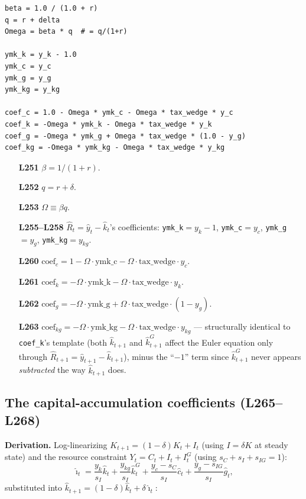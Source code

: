 \documentclass[11pt]{article}
\newcommand{\eq}[1]{\begin{equation}#1\end{equation}}
\begin{document}
\begin{lstlisting}[firstnumber=251]
beta = 1.0 / (1.0 + r)
q = r + delta
Omega = beta * q  # = q/(1+r)

ymk_k = y_k - 1.0
ymk_c = y_c
ymk_g = y_g
ymk_kg = y_kg

coef_c = 1.0 - Omega * ymk_c - Omega * tax_wedge * y_c
coef_k = -Omega * ymk_k - Omega * tax_wedge * y_k
coef_g = -Omega * ymk_g + Omega * tax_wedge * (1.0 - y_g)
coef_kg = -Omega * ymk_kg - Omega * tax_wedge * y_kg
\end{lstlisting}
\begin{itemize}
\item[\textbf{L251}] $\beta=1/(1+r)$.
\item[\textbf{L252}] $q=r+\delta$.
\item[\textbf{L253}] $\Omega\equiv\beta q$.
\item[\textbf{L255--L258}] $\hat R_t=\hat y_t-\hat k_t$'s coefficients:
\texttt{ymk\_k}$=y_k-1$, \texttt{ymk\_c}$=y_c$, \texttt{ymk\_g}$=y_g$,
\texttt{ymk\_kg}$=y_{kg}$.
\item[\textbf{L260}] $\text{coef}_c=1-\Omega\cdot\text{ymk\_c}-\Omega\cdot\text{tax\_wedge}\cdot y_c$.
\item[\textbf{L261}] $\text{coef}_k=-\Omega\cdot\text{ymk\_k}-\Omega\cdot\text{tax\_wedge}\cdot y_k$.
\item[\textbf{L262}] $\text{coef}_g=-\Omega\cdot\text{ymk\_g}+\Omega\cdot\text{tax\_wedge}\cdot(1-y_g)$.
\item[\textbf{L263}] $\text{coef}_{kg}=-\Omega\cdot\text{ymk\_kg}-\Omega\cdot\text{tax\_wedge}\cdot y_{kg}$
--- structurally identical to \texttt{coef\_k}'s template (both $\hat
k_{t+1}$ and $\hat k^G_{t+1}$ affect the Euler equation only through $\hat
R_{t+1}=\hat y_{t+1}-\hat k_{t+1}$), minus the ``$-1$'' term since $\hat
k^G_{t+1}$ never appears \emph{subtracted} the way $\hat k_{t+1}$ does.
\end{itemize}

\subsection{The capital-accumulation coefficients (L265--L268)}
\label{sec:capaccumsec}

\textbf{Derivation.} Log-linearizing $K_{t+1}=(1-\delta)K_t+I_t$ (using
$I=\delta K$ at steady state) and the resource constraint $Y_t=C_t+I_t+I^G_t$
(using $s_C+s_I+s_{IG}=1$):
\eq{ \hat\imath_t = \frac{y_k}{s_I}\hat k_t+\frac{y_{kg}}{s_I}\hat k^G_t+\frac{y_c-s_C}{s_I}\hat c_t+\frac{y_g-s_{IG}}{s_I}\hat g_t, }
substituted into $\hat k_{t+1}=(1-\delta)\hat k_t+\delta\hat\imath_t$:
\end{document}
